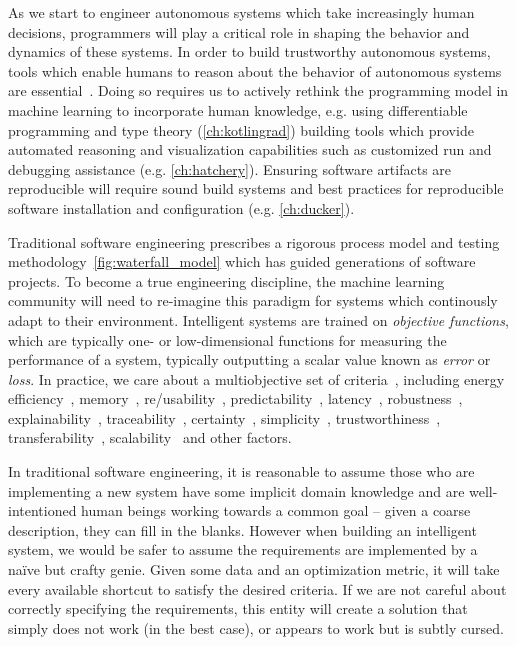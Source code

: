 As we start to engineer autonomous systems which take increasingly human decisions, programmers will play a critical role in shaping the behavior and dynamics of these systems. In order to build trustworthy autonomous systems, tools which enable humans to reason about the behavior of autonomous systems are essential~\citep{famelis2012partial}. Doing so requires us to actively rethink the programming model in machine learning to incorporate human knowledge, e.g. using differentiable programming and type theory (\autoref{ch:kotlingrad}) building tools which provide automated reasoning and visualization capabilities such as customized run and debugging assistance (e.g. \autoref{ch:hatchery}). Ensuring software artifacts are reproducible will require sound build systems and best practices for reproducible software installation and configuration (e.g. \autoref{ch:ducker}).

Traditional software engineering prescribes a rigorous process model and testing methodology~\autoref{fig:waterfall_model} which has guided generations of software projects. To become a true engineering discipline, the machine learning community will need to re-imagine this paradigm for systems which continously adapt to their environment. Intelligent systems are trained on \textit{objective functions}, which are typically one- or low-dimensional functions for measuring the performance of a system, typically outputting a scalar value known as \textit{error} or \textit{loss}. In practice, we care about a multiobjective set of criteria~\citep{censi2015mathematical}, including energy efficiency~\citep{paull2010novel}, memory~\citep{memory2013mitliagkas}, re/usability~\citep{breuleux2017automatic,deleu2019torchmeta}, predictability~\citep{turner2017well}, latency~\citep{ravanelli2018twin}, robustness~\citep{pineau2003policy}, explainability~\citep{turner2016model}, traceability~\citep{guo2017semantically, tsirigotis2018orion}, certainty~\citep{diaz2018interactive}, simplicity~\citep{kastner2019representation}, trustworthiness~\citep{xu2017efficient}, transferability~\citep{mehta2019active}, scalability~\citep{luan2019break} and other factors.

In traditional software engineering, it is reasonable to assume those who are implementing a new system have some implicit domain knowledge and are well-intentioned human beings working towards a common goal -- given a coarse description, they can fill in the blanks. However when building an intelligent system, we would be safer to assume the requirements are implemented by a na\"ive but crafty genie. Given some data and an optimization metric, it will take every available shortcut to satisfy the desired criteria. If we are not careful about correctly specifying the requirements, this entity will create a solution that simply does not work (in the best case), or appears to work but is subtly cursed.

